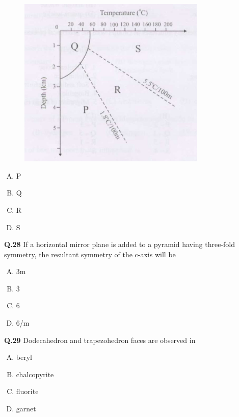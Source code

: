 \begin{figure}[h] %
    \centering
    \includegraphics[width=0.8\textwidth]{gg_2008 (2)-images-3.jpg} %
   
    \label{fig:screenshot}
\end{figure}
\begin{multicols}{4}
    

\begin{enumerate}[(A)]
\item P \item  Q \item  R \item  S
\end{enumerate}
\end{multicols}

\textbf{Q.28} If a horizontal mirror plane is added to a pyramid having three-fold symmetry, the resultant symmetry of the c-axis will be
\begin{multicols}{4}
\begin{enumerate}[(A)]
\item 3m \item  $\bar{3}$ \item  6 \item  6/m
\end{enumerate}
\end{multicols}


\textbf{Q.29} Dodecahedron and trapezohedron faces are observed in
\begin{multicols}{4}
\begin{enumerate}[(A)]
\item beryl \item  chalcopyrite \item  fluorite \item  garnet
\end{enumerate}
\end{multicols}

